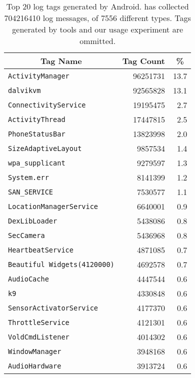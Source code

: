 \begin{table}[t]
\begin{threeparttable}
{\small
\begin{tabularx}{\columnwidth}{Xrr}
\multicolumn{1}{c}{\normalsize{\textbf{Tag Name}}} & 
\multicolumn{1}{c}{\normalsize{\textbf{Tag Count}}} & 
\multicolumn{1}{c}{\normalsize{\textbf{\%}}} \\
\toprule
\texttt{ActivityManager} & \num{96251731} & 13.7 \\
\texttt{dalvikvm} & \num{92565828} & 13.1 \\
\texttt{ConnectivityService} & \num{19195475} & 2.7 \\
\texttt{ActivityThread} & \num{17447815} & 2.5 \\
\texttt{PhoneStatusBar} & \num{13823998} & 2.0 \\
\texttt{SizeAdaptiveLayout} & \num{9857534} & 1.4 \\
\texttt{wpa\_supplicant} & \num{9279597} & 1.3 \\
\texttt{System.err} & \num{8141399} & 1.2 \\
\texttt{SAN\_SERVICE} & \num{7530577} & 1.1 \\
\texttt{LocationManagerService} & \num{6640001} & 0.9 \\
\texttt{DexLibLoader} & \num{5438086} & 0.8 \\
\texttt{SecCamera} & \num{5436968} & 0.8 \\
\texttt{HeartbeatService} & \num{4871085} & 0.7 \\
\texttt{Beautiful Widgets(4120000)} & \num{4692578} & 0.7 \\
\texttt{AudioCache} & \num{4447544} & 0.6 \\
\texttt{k9} & \num{4330848} & 0.6 \\
\texttt{SensorActivatorService} & \num{4177370} & 0.6 \\
\texttt{ThrottleService} & \num{4121301} & 0.6 \\
\texttt{VoldCmdListener} & \num{4014302} & 0.6 \\
\texttt{WindowManager} & \num{3948168} & 0.6 \\
\texttt{AudioHardware} & \num{3913724} & 0.6 \\
\end{tabularx}
}
\caption{Top 20 log tags generated by Android. \textnormal{\PhoneLab{} has
collected \num{704216410} log messages, of \num{7556} different types. Tags generated
by \PhoneLab{} tools and our usage experiment are ommitted.}}
\end{threeparttable}
\label{table-logtags}
\end{table}

